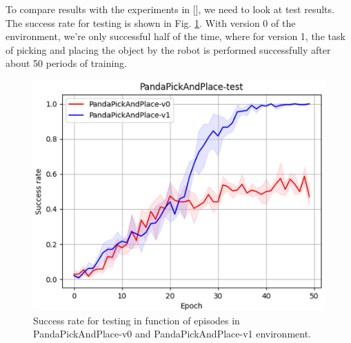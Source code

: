 \documentclass[conference]{IEEEtran}
\begin{document}
To compare results with the experiments in [\cite{plappert2018multi}], we need to look at test results. The success rate for testing is shown in Fig. \ref{fig:exp_deep_test}. With version 0 of the environment, we're only successful half of the time, where for version 1, the task of picking and placing the object by the robot is performed successfully after about 50 periods of training.
\begin{figure}[ht]
\centering
\includegraphics[width=0.8\columnwidth]{img/exp_deep_test.png}
\caption{Success rate for testing in function of episodes in PandaPickAndPlace-v0 and PandaPickAndPlace-v1 environment.}
\label{fig:exp_deep_test}
\end{figure}
\end{document}
